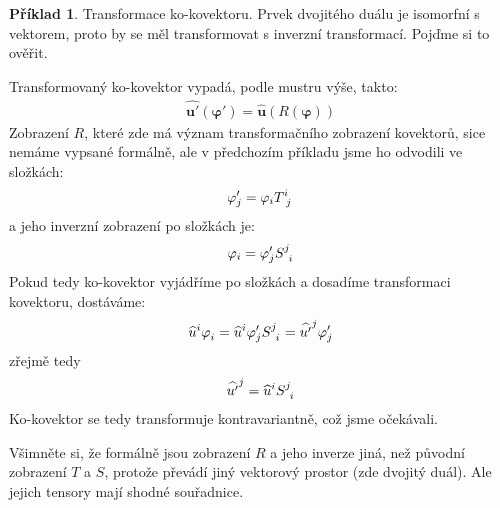 \documentclass[a5paper,12pt]{amsbook}
\theoremstyle{definition}
\newtheorem{example}{Příklad}[chapter]
\newcommand{\myvec}[1]{\bm{#1}}
\newcommand{\mycocovec}[1]{\mathbf{\widehat{#1}}}
\newcommand{\mycocoord}[1]{\widehat{#1}}
\begin{document}
\begin{example}
Transformace ko-kovektoru. Prvek dvojitého duálu je isomorfní s vektorem,
proto by se měl transformovat s inverzní transformací. Pojďme si to ověřit.

Transformovaný ko-kovektor vypadá, podle mustru výše, takto:
\begin{equation*}
\begin{split}
\mycocovec{u'}(\myvec{\varphi'}) = \mycocovec{u}(R(\myvec{\varphi}))
\end{split}
\end{equation*}
Zobrazení $R$, které zde má význam transformačního zobrazení kovektorů,
sice nemáme vypsané formálně, ale v předchozím příkladu jsme ho odvodili
ve složkách:
\begin{equation*}
\begin{split}
\varphi'_j = \varphi_i T\indices{^i_j}
\end{split}
\end{equation*}
a jeho inverzní zobrazení po složkách je:
\begin{equation*}
\begin{split}
\varphi_i = \varphi'_j S\indices{^j_i}
\end{split}
\end{equation*}
Pokud tedy ko-kovektor vyjádříme po složkách a dosadíme transformaci kovektoru,
dostáváme:
\begin{equation*}
\begin{split}
\mycocoord{u}\indices{^i}\varphi\indices{_i} = \mycocoord{u}\indices{^i}\varphi'_j S\indices{^j_i}
  = \mycocoord{u'}\indices{^j}\varphi'_j
\end{split}
\end{equation*}
zřejmě tedy
\begin{equation*}
\begin{split}
\mycocoord{u'}\indices{^j} = \mycocoord{u}\indices{^i} S\indices{^j_i}
\end{split}
\end{equation*}
Ko-kovektor se tedy transformuje kontravariantně, což jsme očekávali.

Všimněte si, že formálně jsou zobrazení $R$ a jeho inverze jiná, než
původní zobrazení $T$ a $S$, protože převádí jiný vektorový prostor
(zde dvojitý duál). Ale jejich tensory mají shodné souřadnice.

\end{example}
\end{document}
